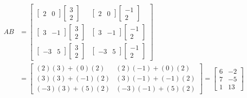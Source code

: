 \begin{example}
\begin{align*}
	AB & =
	\begin{bmatrix}
\begin{bmatrix}
 2 & 0
\end{bmatrix}
\begin{bmatrix}
 3 \\ 2
\end{bmatrix} &
\begin{bmatrix}
 2 & 0
\end{bmatrix}
\begin{bmatrix}
 -1 \\ 2
\end{bmatrix} \\[8pt]
\begin{bmatrix}
3 & -1
\end{bmatrix}
\begin{bmatrix}
 3 \\ 2
\end{bmatrix} &
\begin{bmatrix}
3 & -1
\end{bmatrix}
\begin{bmatrix}
 -1 \\ 2
\end{bmatrix} \\[8pt]
\begin{bmatrix}
-3 & 5
\end{bmatrix}
\begin{bmatrix}
 3 \\ 2
\end{bmatrix} &
\begin{bmatrix}
 -3 & 5
\end{bmatrix}
\begin{bmatrix}
 -1 \\ 2
\end{bmatrix}
	\end{bmatrix} \\
	& =
\begin{bmatrix}
	(2)(3) + (0)(2) & (2)(-1)+(0)(2) \\
	(3)(3) + (-1)(2) & (3)(-1) +(-1)(2) \\
	(-3)(3) + (5)(2) & (-3)(-1) +(5)(2)
\end{bmatrix} =
\begin{bmatrix}
	6 & -2 \\
	7 & -5 \\
	1 & 13
\end{bmatrix}
\end{align*}
\end{example}

